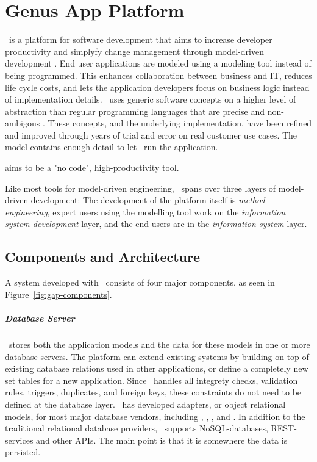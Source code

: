 \chapter{Genus App Platform}
\label{chap:gap}

\gap~is a platform for software development that aims to increase developer productivity and simplyfy change management through model-driven development \cite{Genus_AS2016-kt}. End user applications are modeled using a modeling tool instead of being programmed. This enhances collaboration between business and IT, reduces life cycle costs, and lets the application developers focus on business logic instead of implementation details. \gap~uses generic software concepts on a higher level of abstraction than regular programming languages that are precise and non-ambigous \cite{noauthor_undated-qy}. These concepts, and the underlying implementation, have been refined and improved through years of trial and error on real customer use cases. The model contains enough detail to let \gap~run the application.

\gap aims to be a "no code", high-productivity tool.

Like most tools for model-driven engineering, \gap~spans over three layers of model-driven development: The development of the platform itself is \textit{method engineering}, expert users using the modelling tool work on the \textit{information system development} layer, and the end users are in the \textit{information system} layer.


\section{Components and Architecture}
\label{sec:Components and Architecture}
A system developed with \gap~consists of four major components, as seen in Figure~\ref{fig:gap-components}.

\paragraph{Database Server}
\label{par:Database Server}
\gap~stores both the application models and the data for these models in one or more database servers. The platform can extend existing systems by building on top of existing database relations used in other applications, or define a completely new set tables for a new application. Since \gap~handles all integrety checks, validation rules, triggers, duplicates, and foreign keys, these constraints do not need to be defined at the database layer. \genus~has developed adapters, or object relational models, for most major database vendors, including , , , and . In addition to the traditional relational database providers, \gap~supports NoSQL-databases, REST-services and other APIs. The main point is that it is somewhere the data is persisted.


